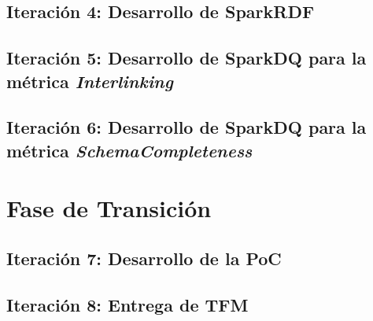 \subsection{Iteración 4: Desarrollo de SparkRDF}



\subsection{Iteración 5: Desarrollo de SparkDQ para la métrica \textit{Interlinking}}



\subsection{Iteración 6: Desarrollo de SparkDQ para la métrica \textit{SchemaCompleteness}}



\section{Fase de Transición}

\subsection{Iteración 7: Desarrollo de la PoC}



\subsection{Iteración 8: Entrega de TFM}


